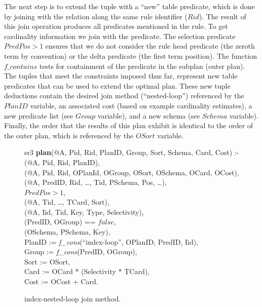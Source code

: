 The next step is to extend the  tuple with a ``new'' table predicate,
which is done by joining with the  relation along the same
rule identifier ($Rid$).  The result of this join operation produces all
predicates mentioned in the rule.  To get cardinality information we join with
the  predicate.  The selection predicate $PredPos > 1$ ensures
that we do not consider the rule head predicate (the zeroth term by convention)
or the delta predicate (the first term position).  The function $f\_contains$
tests for containment of the predicate in the subplan (outer plan).  The tuples
that meet the constraints imposed thus far, represent new table predicates that
can be used to extend the optimal plan.  These new  tuple deductions
contain the desired join method (``nested-loop'') referenced by the $PlanID$
variable, an associated cost (based on example cardinality estimates), a
new predicate list (see $Group$ variable), and a new schema (see $Schema$
variable).  Finally, the order that the results of this plan exhibit is
identical to the order of the outer plan, which is referenced by the $OSort$
variable.

\begin{figure*}
\ssp
\centering
\begin{boxedminipage}{\linewidth}

sr3 {\bf plan}(@A, Pid, Rid, PlanID, Group, Sort, Schema, Card, Cost) :- \\
(@A, Pid, Rid, PlanID),\\
(@A, Pid, Rid, OPlanId, OGroup, OSort, OSchema, OCard, OCost), \\
(@A, PredID, Rid, \ldots, Tid, PSchema, Pos, \ldots), \\
\datalogspace $PredPos > 1$,\\
(@A, Tid, \ldots, TCard, Sort),\\
(@A, Iid, Tid, Key, Type, Selectivity),\\
(PredID, OGroup) == $false$,\\
(OSchema, PSchema, Key),\\
\datalogspace PlanID := {\em f\_cons}(``index-loop'', OPlanID, PredID, Iid),\\
\datalogspace Group := {\em f\_cons}(PredID, OGroup),\\
\datalogspace Sort := OSort, \\
\datalogspace Card   := OCard * (Selectivity * TCard),\\
\datalogspace Cost   := OCost + Card.

\end{boxedminipage}
\caption{\label{ch:opt:fig:plangen2}index-nested-loop join method.}
\end{figure*}

